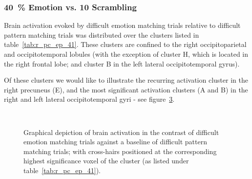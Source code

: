 	    \subsubsection{\SI{40}{\percent} Emotion vs. \SI{10}{\pixel} Scrambling}\label{sec:r_pc_ep_41}
		Brain activation evoked by difficult emotion matching trials relative to difficult pattern matching trials was distributed over the clusters listed in table~\ref{tab:r_pc_ep_41}.
		These clusters are confined to the right occipitoparietal and occipitotemporal lobules (with the exception of cluster H, which is located in the right frontal lobe; and cluster B in the left lateral occipitotemporal gyrus).
		
		Of these clusters we would like to illustrate the recurring activation cluster in the right precuneus (E), and the most significant activation clusters (A and B) in the right and left lateral occipitotemporal gyri - see figure~\ref{fig:r_pc_ep_41}.
		\begin{figure}[H]
		    \begin{subfigure}[H]{0.495\textwidth}
			\centering{}
			\label{fig:r_pc_ep_41_pc}
		    \end{subfigure}
		    ~%
		    \begin{subfigure}[H]{0.495\textwidth}
			\centering{}
			\label{fig:r_pc_ep_41_ot}
		    \end{subfigure}
		    \caption{Graphical depiction of brain activation in the contrast of difficult emotion matching trials against a baseline of difficult pattern matching trials; with cross-hairs positioned at the corresponding highest significance voxel of the cluster (as listed under table~\ref{tab:r_pc_ep_41}).}
		    \label{fig:r_pc_ep_41}
		\end{figure}
		
